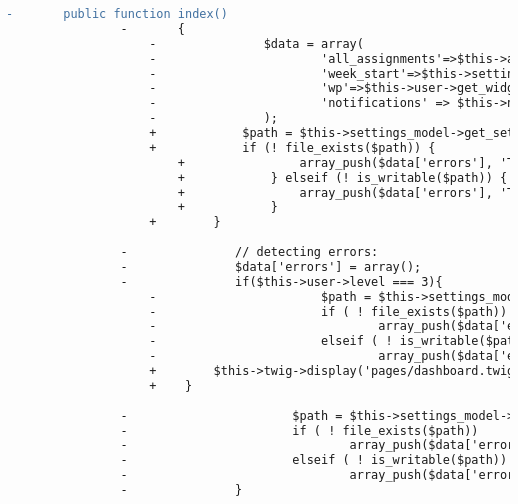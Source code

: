 \begin{lstlisting}[language=diff, caption=Perubahan pada kode Dashboard.php]
				-       public function index()
				-       {
					-               $data = array(
					-                       'all_assignments'=>$this->assignment_model->all_assignments(),
					-                       'week_start'=>$this->settings_model->get_setting('week_start'),
					-                       'wp'=>$this->user->get_widget_positions(),
					-                       'notifications' => $this->notifications_model->get_latest_notifications()
					-               );
					+            $path = $this->settings_model->get_setting('tester_path');
					+            if (! file_exists($path)) {
						+                array_push($data['errors'], 'The path to folder "tester" is not set correctly. Move this folder somewhere not publicly accessible, and set its full path in Settings.');
						+            } elseif (! is_writable($path)) {
						+                array_push($data['errors'], 'The folder <code>"'.$path.'"</code> is not writable by PHP. Make it writable. But make sure that this folder is only accessible by you.');
						+            }
					+        }
				
				-               // detecting errors:
				-               $data['errors'] = array();
				-               if($this->user->level === 3){
					-                       $path = $this->settings_model->get_setting('assignments_root');
					-                       if ( ! file_exists($path))
					-                               array_push($data['errors'], 'The path to folder "assignments" is not set correctly. Move this folder somewhere not publicly accessible, and set its full path in Settings.');
					-                       elseif ( ! is_writable($path))
					-                               array_push($data['errors'], 'The folder <code>"'.$path.'"</code> is not writable by PHP. Make it writable. But make sure that this folder is only accessible by you. Codes will be saved in this folder!');
					+        $this->twig->display('pages/dashboard.twig', $data);
					+    }
				
				-                       $path = $this->settings_model->get_setting('tester_path');
				-                       if ( ! file_exists($path))
				-                               array_push($data['errors'], 'The path to folder "tester" is not set correctly. Move this folder somewhere not publicly accessible, and set its full path in Settings.');
				-                       elseif ( ! is_writable($path))
				-                               array_push($data['errors'], 'The folder <code>"'.$path.'"</code> is not writable by PHP. Make it writable. But make sure that this folder is only accessible by you.');
				-               }
			

\end{lstlisting}
